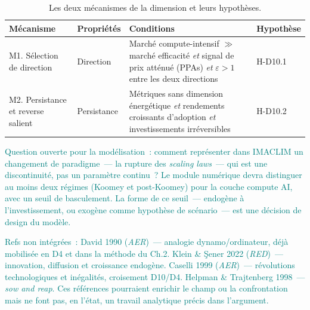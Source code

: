 \begin{table}[!ht]
\caption{Les deux mécanismes de la dimension et leurs hypothèses.}\label{tab:d10-mecanismes}
\centering\footnotesize
\renewcommand{\arraystretch}{1.25}
\begin{tabularx}{\textwidth}{@{}p{2.2cm}p{2.8cm}p{3.6cm}X@{}}
\toprule
\textbf{Mécanisme} & \textbf{Propriétés} & \textbf{Conditions} & \textbf{Hypothèse} \\
\midrule
M1. Sélection de direction & Direction & Marché compute-intensif $\gg$ marché efficacité \emph{et} signal de prix atténué (PPAs) \emph{et} $\varepsilon > 1$ entre les deux directions & H-D10.1 \\
M2. Persistance et reverse salient & Persistance & Métriques sans dimension énergétique \emph{et} rendements croissants d'adoption \emph{et} investissements irréversibles & H-D10.2 \\
\bottomrule
\end{tabularx}
\renewcommand{\arraystretch}{1.0}
\end{table}


\textcolor{teal}{Question ouverte pour la modélisation~: comment représenter dans IMACLIM un changement de paradigme~--- la rupture des \emph{scaling laws}~--- qui est une discontinuité, pas un paramètre continu~? Le module numérique devra distinguer au moins deux régimes (Koomey et post-Koomey) pour la couche compute AI, avec un seuil de basculement. La forme de ce seuil~--- endogène à l'investissement, ou exogène comme hypothèse de scénario~--- est une décision de design du modèle.}

\textcolor{teal}{Refs non intégrées~: David 1990 (\emph{AER})~--- analogie dynamo/ordinateur, déjà mobilisée en D4 et dans la méthode du Ch.2. Klein \& \c{S}ener 2022 (\emph{RED})~--- innovation, diffusion et croissance endogène. Caselli 1999 (\emph{AER})~--- révolutions technologiques et inégalités, croisement D10/D4. Helpman \& Trajtenberg 1998~--- \emph{sow and reap}. Ces références pourraient enrichir le champ ou la confrontation mais ne font pas, en l'état, un travail analytique précis dans l'argument.}

